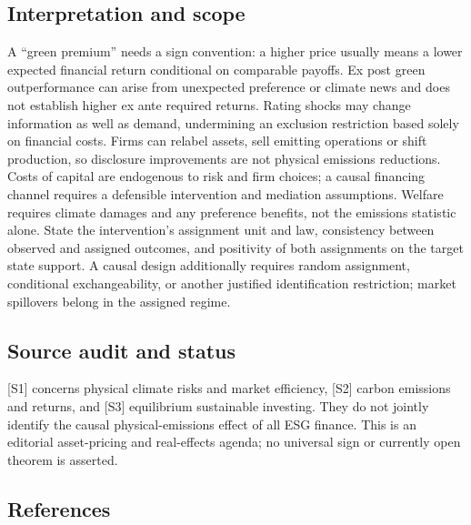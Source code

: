 \documentclass[11pt,a4paper]{article}
\begin{document}
\subsection*{Interpretation and scope}
A ``green premium'' needs a sign convention: a higher price usually means a lower expected financial return conditional on comparable payoffs. Ex post green outperformance can arise from unexpected preference or climate news and does not establish higher ex ante required returns. Rating shocks may change information as well as demand, undermining an exclusion restriction based solely on financial costs. Firms can relabel assets, sell emitting operations or shift production, so disclosure improvements are not physical emissions reductions. Costs of capital are endogenous to risk and firm choices; a causal financing channel requires a defensible intervention and mediation assumptions. Welfare requires climate damages and any preference benefits, not the emissions statistic alone. State the intervention's assignment unit and law, consistency between observed and assigned outcomes, and positivity of both assignments on the target state support. A causal design additionally requires random assignment, conditional exchangeability, or another justified identification restriction; market spillovers belong in the assigned regime.

\subsection*{Source audit and status}
[S1] concerns physical climate risks and market efficiency, [S2] carbon emissions and returns, and [S3] equilibrium sustainable investing. They do not jointly identify the causal physical-emissions effect of all ESG finance. This is an editorial asset-pricing and real-effects agenda; no universal sign or currently open theorem is asserted.

\subsection*{References}
\end{document}
